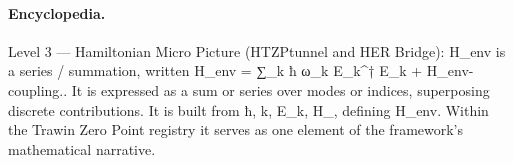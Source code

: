 \paragraph{Encyclopedia.}
Level 3 — Hamiltonian Micro Picture (HTZPtunnel and HER Bridge): H\_env is a series / summation, written H\_env = ∑\_k ħ ω\_k E\_k\textasciicircum{}† E\_k + H\_env-coupling.. It is expressed as a sum or series over modes or indices, superposing discrete contributions. It is built from ħ, k, E\_k, H\_, defining H\_env. Within the Trawin Zero Point registry it serves as one element of the framework's mathematical narrative.

